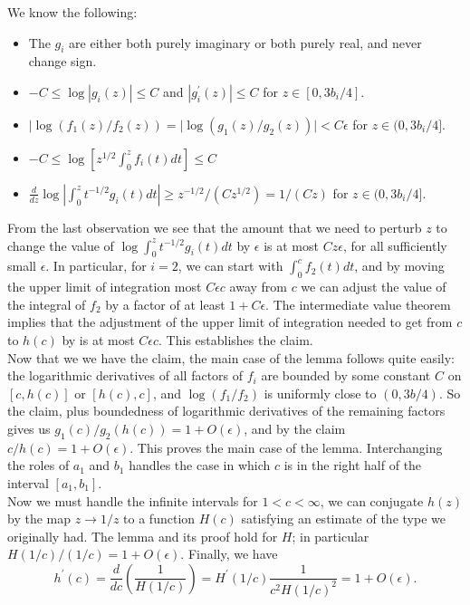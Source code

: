 \documentclass[12pt]{article}
\begin{document}
\noindent We know the following:

\begin{itemize}
\item The $g_i$ are either both purely imaginary or both purely real, and never change sign.
\item $-C \leq \log|g_i(z)| \leq C$ and $|g_i^\prime(z)| \leq C$ for $z \in [0,3b_i/4]$.
\item $|\log(f_1(z)/f_2(z)) = |\log (g_1(z)/g_2(z))| < C\epsilon$ for $z \in (0,3b_i/4]$.
\item $-C \leq \log [z^{1/2}\int_0^z f_i(t)dt] \leq C$
\item $\frac{d}{dz}\log\left|\int_0^z t^{-1/2}g_i(t)dt\right| \geq z^{-1/2}/(Cz^{1/2}) = 1/(Cz)$ for $z \in (0,3b_i/4]$.
\end{itemize}

\noindent From the last observation we see that the amount that we need to perturb $z$ to change the value of $\log \int_0^z t^{-1/2}g_i(t)dt$ by $\epsilon$ is at most $Cz\epsilon$, for all sufficiently small $\epsilon$. In particular, for $i = 2$, we can start with $\int_0^c f_2(t)dt$, and by moving the upper limit of integration most $C\epsilon c$ away from $c$ we can adjust the value of the integral of $f_2$ by a factor of at least $1 + C\epsilon$. The intermediate value theorem implies that the adjustment of the upper limit of integration needed to get from $c$ to $h(c)$ by is at most $C\epsilon c$. This establishes the claim.\\

\noindent Now that we we have the claim, the main case of the lemma follows quite easily: the logarithmic derivatives of all factors of $f_i$ are bounded by some constant $C$ on $[c,h(c)]$ or $[h(c),c]$, and $\log(f_1/f_2)$ is uniformly close to $(0,3b/4)$. So the claim, plus boundedness of logarithmic derivatives of the remaining factors gives us $g_1(c)/g_2(h(c)) = 1 + O(\epsilon)$, and by the claim $c/h(c) = 1 + O(\epsilon)$. This proves the main case of the lemma. Interchanging the roles of $a_1$ and $b_1$ handles the case in which $c$ is in the right half of the interval $[a_1,b_1]$.\\

\noindent Now we must handle the infinite intervals for $1 < c < \infty$, we can conjugate $h(z)$ by the map $z \to 1/z$ to a function $H(c)$ satisfying an estimate of the type we originally had. The lemma and its proof hold for $H$; in particular $H(1/c)/(1/c) = 1 + O(\epsilon)$. Finally, we have $$h^\prime(c) = \frac{d}{dc}\left(\frac{1}{H(1/c)}\right) = H^{\prime}(1/c) \frac{1}{c^2 H(1/c)^2} = 1 + O(\epsilon).$$
\end{document}
